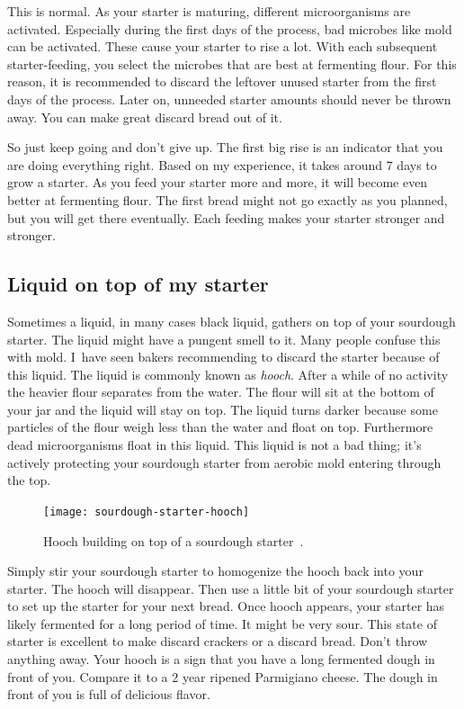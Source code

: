 This is normal. As your starter is maturing, different
microorganisms are activated. Especially during
the first days of the process, bad microbes
like mold can be activated. These cause your
starter to rise a lot. With each subsequent
starter-feeding, you select the microbes that are best
at fermenting flour. For this reason, it is
recommended to discard the leftover unused starter
from the first days of the process. Later on, unneeded
starter amounts should never be thrown away. You can make
great discard bread out of it.

So just keep going and don't give up. The first big
rise is an indicator that you are doing everything
right. Based on my experience, it takes around 7
days to grow a starter. As you feed your starter
more and more, it will become even better at fermenting
flour. The first bread might not go exactly as you
planned, but you will get there eventually. Each
feeding makes your starter stronger and stronger.

\subsection{Liquid on top of my starter}

Sometimes a liquid, in many cases black liquid, gathers on top
of your sourdough starter. The liquid might have a pungent
smell to it. Many people confuse this with mold. I~have seen
bakers recommending to discard the starter because of this liquid.
The liquid is commonly known as \emph{hooch}. After a while
of no activity the heavier flour separates from the water. The flour
will sit at the bottom of your jar and the liquid will stay on top.
The liquid turns darker because some particles of the flour weigh
less than the water and float on top. Furthermore dead microorganisms
float in this liquid. This liquid is not a bad thing; it's actively
protecting your sourdough starter from aerobic mold entering through
the top.

\begin{figure}[!htb]
\centering
  \texttt{[image: sourdough-starter-hooch]}
  \caption[Hooch] {Hooch building on top of a sourdough
      starter~\cite{liquid+on+starter}.}%
  \label{fig:hooch}
\end{figure}

Simply stir your sourdough starter to homogenize the hooch back
into your starter. The hooch will disappear. Then use a little bit of
your sourdough starter to set up the starter for your next bread.
Once hooch appears, your starter has likely fermented for a long
period of time. It might be very sour. This state of starter
is excellent to make discard crackers or a discard bread. Don't throw
anything away. Your hooch is a sign that you have a long fermented
dough in front of you. Compare it to a 2 year ripened Parmigiano cheese.
The dough in front of you is full of delicious flavor.

